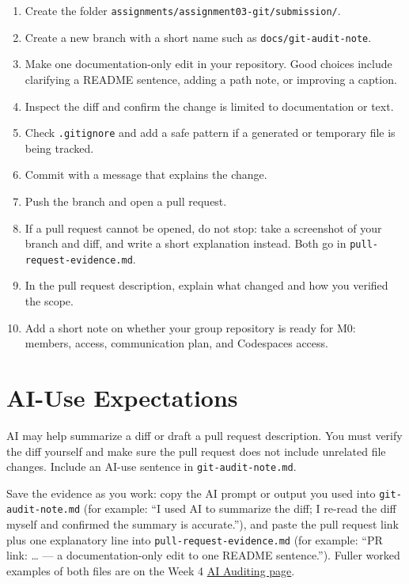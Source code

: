 \documentclass[
  letterpaper,
  DIV=11,
  numbers=noendperiod,
  oneside]{scrreprt}
\providecommand{\tightlist}{%
  \setlength{\itemsep}{0pt}\setlength{\parskip}{0pt}}
\begin{document}
\begin{enumerate}
\def\labelenumi{\arabic{enumi}.}
\tightlist
\item
  Create the folder \texttt{assignments/assignment03-git/submission/}.
\item
  Create a new branch with a short name such as
  \texttt{docs/git-audit-note}.
\item
  Make one documentation-only edit in your repository. Good choices
  include clarifying a README sentence, adding a path note, or improving
  a caption.
\item
  Inspect the diff and confirm the change is limited to documentation or
  text.
\item
  Check \texttt{.gitignore} and add a safe pattern if a generated or
  temporary file is being tracked.
\item
  Commit with a message that explains the change.
\item
  Push the branch and open a pull request.
\item
  If a pull request cannot be opened, do not stop: take a screenshot of
  your branch and diff, and write a short explanation instead. Both go
  in \texttt{pull-request-evidence.md}.
\item
  In the pull request description, explain what changed and how you
  verified the scope.
\item
  Add a short note on whether your group repository is ready for M0:
  members, access, communication plan, and Codespaces access.
\end{enumerate}

\section{AI-Use Expectations}\label{ai-use-expectations-2}

AI may help summarize a diff or draft a pull request description. You
must verify the diff yourself and make sure the pull request does not
include unrelated file changes. Include an AI-use sentence in
\texttt{git-audit-note.md}.

Save the evidence as you work: copy the AI prompt or output you used
into \texttt{git-audit-note.md} (for example: ``I used AI to summarize
the diff; I re-read the diff myself and confirmed the summary is
accurate.''), and paste the pull request link plus one explanatory line
into \texttt{pull-request-evidence.md} (for example: ``PR link: \ldots{}
--- a documentation-only edit to one README sentence.''). Fuller worked
examples of both files are on the Week 4 \hyperref[ai-auditing]{AI
Auditing page}.
\end{document}
